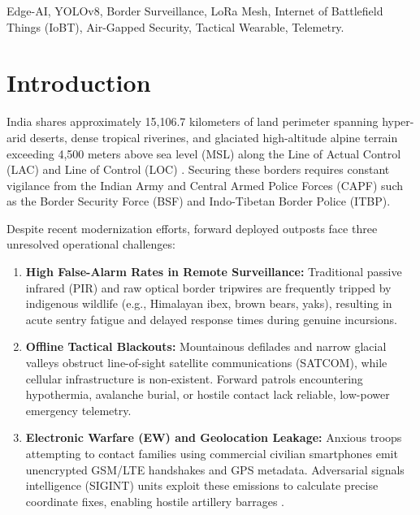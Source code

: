 \documentclass[conference]{IEEEtran}
\begin{document}
\begin{IEEEkeywords}
Edge-AI, YOLOv8, Border Surveillance, LoRa Mesh, Internet of Battlefield Things (IoBT), Air-Gapped Security, Tactical Wearable, Telemetry.
\end{IEEEkeywords}

\section{Introduction}
India shares approximately 15,106.7 kilometers of land perimeter spanning hyper-arid deserts, dense tropical riverines, and glaciated high-altitude alpine terrain exceeding 4,500 meters above sea level (MSL) along the Line of Actual Control (LAC) and Line of Control (LOC) \cite{kodali2019lora}. Securing these borders requires constant vigilance from the Indian Army and Central Armed Police Forces (CAPF) such as the Border Security Force (BSF) and Indo-Tibetan Border Police (ITBP).

Despite recent modernization efforts, forward deployed outposts face three unresolved operational challenges:
\begin{enumerate}
    \item \textbf{High False-Alarm Rates in Remote Surveillance:} Traditional passive infrared (PIR) and raw optical border tripwires are frequently tripped by indigenous wildlife (e.g., Himalayan ibex, brown bears, yaks), resulting in acute sentry fatigue and delayed response times during genuine incursions.
    \item \textbf{Offline Tactical Blackouts:} Mountainous defilades and narrow glacial valleys obstruct line-of-sight satellite communications (SATCOM), while cellular infrastructure is non-existent. Forward patrols encountering hypothermia, avalanche burial, or hostile contact lack reliable, low-power emergency telemetry.
    \item \textbf{Electronic Warfare (EW) and Geolocation Leakage:} Anxious troops attempting to contact families using commercial civilian smartphones emit unencrypted GSM/LTE handshakes and GPS metadata. Adversarial signals intelligence (SIGINT) units exploit these emissions to calculate precise coordinate fixes, enabling hostile artillery barrages \cite{decarvalho2020airgap}.
\end{enumerate}
\end{document}
